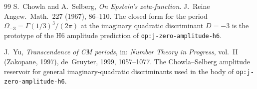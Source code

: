 \documentclass[11pt,a4paper]{article}
\theoremstyle{definition}
\theoremstyle{remark}
\begin{document}
\begin{thebibliography}{99}
S.~Chowla and A.~Selberg, \emph{On Epstein's zeta-function}.
J.~Reine Angew.~Math.\ 227 (1967), 86--110. The closed form for
the period $\Omega_{-3}=\Gamma(1/3)^3/(2\pi)$ at the imaginary
quadratic discriminant $D=-3$ is the prototype of the H6 amplitude
prediction of \texttt{op:j-zero-amplitude-h6}.

J.~Yu, \emph{Transcendence of CM periods}, in: \emph{Number Theory
in Progress}, vol.~II (Zakopane, 1997), de~Gruyter, 1999, 1057--1077.
The Chowla--Selberg amplitude reservoir for general imaginary-quadratic
discriminants used in the body of \texttt{op:j-zero-amplitude-h6}.

\end{thebibliography}
\end{document}
